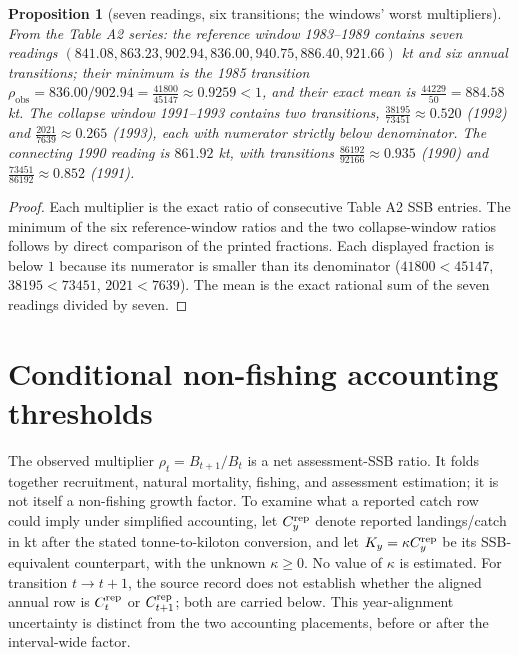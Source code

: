 \documentclass[10pt,twocolumn]{article}
\theoremstyle{plain}
\newtheorem{proposition}[theorem]{Proposition}
\theoremstyle{remark}
\begin{document}
\begin{proposition}[seven readings, six transitions; the windows'
worst multipliers]
\label{prop:windows}
From the Table A2 series: the reference window 1983--1989 contains
seven readings \((841.08, 863.23, 902.94, 836.00, 940.75, 886.40,
921.66)\) kt and six annual transitions; their minimum is the 1985
transition \(\rho_{\mathrm{obs}} = 836.00/902.94 =
\tfrac{41800}{45147} \approx 0.9259 < 1\), and their exact mean is
\(\tfrac{44229}{50} = 884.58\) kt. The collapse window 1991--1993
contains two transitions,
\(\tfrac{38195}{73451} \approx 0.520\) (1992) and
\(\tfrac{2021}{7639} \approx 0.265\) (1993), each with numerator
strictly below denominator. The connecting 1990 reading is
\(861.92\) kt, with transitions
\(\tfrac{86192}{92166} \approx 0.935\) (1990) and
\(\tfrac{73451}{86192} \approx 0.852\) (1991).
\end{proposition}

\begin{proof}
Each multiplier is the exact ratio of consecutive Table A2 SSB entries.
The minimum of the six reference-window ratios and the two
collapse-window ratios follows by direct comparison of the printed
fractions. Each displayed fraction is below \(1\) because its
numerator is smaller than its denominator (\(41800 < 45147\),
\(38195 < 73451\), \(2021 < 7639\)). The mean is the exact rational
sum of the seven readings divided by seven.
\end{proof}

\section{Conditional non-fishing accounting thresholds}\label{brackets}

The observed multiplier \(\rho_t=B_{t+1}/B_t\) is a net assessment-SSB ratio. It folds together recruitment, natural mortality, fishing, and assessment estimation; it is not itself a non-fishing growth factor. To examine what a reported catch row could imply under simplified accounting, let \(C_y^{\rm rep}\) denote reported landings/catch in kt after the stated tonne-to-kiloton conversion, and let \(K_y=\kappa C_y^{\rm rep}\) be its SSB-equivalent counterpart, with the unknown \(\kappa\ge0\). No value of \(\kappa\) is estimated. For transition \(t\to t+1\), the source record does not establish whether the aligned annual row is \(C_t^{\rm rep}\) or \(C_{t+1}^{\rm rep}\); both are carried below. This year-alignment uncertainty is distinct from the two accounting placements, before or after the interval-wide factor.
\end{document}
